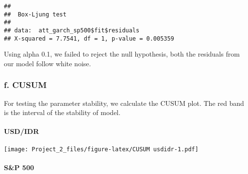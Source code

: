 \documentclass[]{article}
\newenvironment{Shaded}{\begin{snugshade}}{\end{snugshade}}
\newcommand{\KeywordTok}[1]{\textcolor[rgb]{0.13,0.29,0.53}{\textbf{#1}}}
\newcommand{\DataTypeTok}[1]{\textcolor[rgb]{0.13,0.29,0.53}{#1}}
\newcommand{\DecValTok}[1]{\textcolor[rgb]{0.00,0.00,0.81}{#1}}
\newcommand{\StringTok}[1]{\textcolor[rgb]{0.31,0.60,0.02}{#1}}
\newcommand{\OperatorTok}[1]{\textcolor[rgb]{0.81,0.36,0.00}{\textbf{#1}}}
\newcommand{\NormalTok}[1]{#1}
\let\oldparagraph\paragraph
\renewcommand{\paragraph}[1]{\oldparagraph{#1}\mbox{}}
\begin{document}
\begin{Shaded}
\end{Shaded}

\begin{verbatim}
## 
##  Box-Ljung test
## 
## data:  att_garch_sp500$fit$residuals
## X-squared = 7.7541, df = 1, p-value = 0.005359
\end{verbatim}

Using alpha 0.1, we failed to reject the null hypothesis, both the
residuals from our model follow white noise.

\subsubsection{f. CUSUM}\label{f.-cusum}

For testing the parameter stability, we calculate the CUSUM plot. The
red band is the interval of the stability of model.

\paragraph{USD/IDR}\label{usdidr}

\begin{Shaded}
\end{Shaded}

\texttt{[image: Project\_2\_files/figure-latex/CUSUM usdidr-1.pdf]}

\paragraph{S\&P 500}\label{sp-500}

\begin{Shaded}
\end{Shaded}
\end{document}
